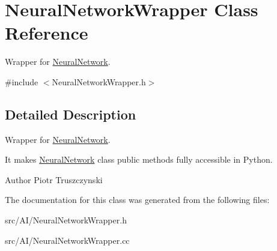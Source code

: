 \hypertarget{classNeuralNetworkWrapper}{}\section{Neural\+Network\+Wrapper Class Reference}
\label{classNeuralNetworkWrapper}


Wrapper for \hyperlink{classNeuralNetwork}{Neural\+Network}.  




{\ttfamily \#include $<$Neural\+Network\+Wrapper.\+h$>$}



\subsection{Detailed Description}
Wrapper for \hyperlink{classNeuralNetwork}{Neural\+Network}. 

It makes \hyperlink{classNeuralNetwork}{Neural\+Network} class public methods fully accessible in Python. \begin{DoxyAuthor}{Author}
Piotr Truszczynski 
\end{DoxyAuthor}


The documentation for this class was generated from the following files\+:\begin{DoxyCompactItemize}
\item 
src/\+A\+I/Neural\+Network\+Wrapper.\+h\item 
src/\+A\+I/Neural\+Network\+Wrapper.\+cc\end{DoxyCompactItemize}
